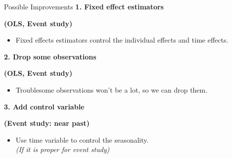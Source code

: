\documentclass[]{beamer}
\begin{document}
\begin{frame}
\begin{columns}
\begin{block}{\small{Possible Improvements}}
         \small \textbf{\alert{1.} Fixed effect estimators}\vskip -0.2cm 
                \begin{itemize}
                   \textbf{\tiny{(OLS, Event study)}} 
                \end{itemize} \vskip -0.3cm 
                    \begin{itemize}
                     \scriptsize
                    \item Fixed effects estimators control the individual effects and time effects. \vskip 0.3cm
                    \end{itemize}

         \small \textbf{\alert{2.} Drop some observations}\vskip -0.2cm
                \begin{itemize}
                   \textbf{\tiny{(OLS, Event study)}} 
                \end{itemize} \vskip -0.3cm
                    \begin{itemize}
                     \scriptsize
                    \item Troublesome observations won't be a lot, so we can drop them.\\ \vskip 0.3cm
                    \end{itemize}

            \small \textbf{\alert{3}. Add control variable} \vskip -0.2cm
                \begin{itemize}
                   \textbf{\tiny{(Event study: near past)}} 
                \end{itemize}\vskip -0.3cm
                    \begin{itemize}
                     \scriptsize 
                    \item Use time variable to control the seasonality.\\ \vskip 0.03cm
                    \tiny{\textit{(If it is proper for event study)}}
                    \end{itemize}
                    \vskip 0.1cm
                    \begin{itemize}
                        \textbf{}
                    \end{itemize}
                  

        \end{block}

  \end{columns}
\end{frame}
\end{document}
